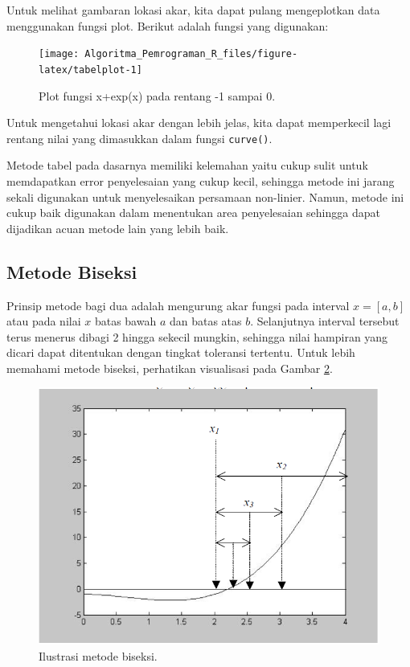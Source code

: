 \documentclass[
]{book}
\theoremstyle{definition}
\theoremstyle{definition}
\theoremstyle{definition}
\theoremstyle{definition}
\theoremstyle{remark}
\begin{document}
Untuk melihat gambaran lokasi akar, kita dapat pulang mengeplotkan data menggunakan fungsi plot. Berikut adalah fungsi yang digunakan:

\begin{figure}

{\centering \texttt{[image: Algoritma\_Pemrograman\_R\_files/figure-latex/tabelplot-1]} 

}

\caption{Plot fungsi x+exp(x) pada rentang -1 sampai 0.}\label{fig:tabelplot}
\end{figure}

Untuk mengetahui lokasi akar dengan lebih jelas, kita dapat memperkecil lagi rentang nilai yang dimasukkan dalam fungsi \texttt{curve()}.

Metode tabel pada dasarnya memiliki kelemahan yaitu cukup sulit untuk memdapatkan error penyelesaian yang cukup kecil, sehingga metode ini jarang sekali digunakan untuk menyelesaikan persamaan non-linier. Namun, metode ini cukup baik digunakan dalam menentukan area penyelesaian sehingga dapat dijadikan acuan metode lain yang lebih baik.

\hypertarget{bisection}{%
\subsection{Metode Biseksi}\label{bisection}}

Prinsip metode bagi dua adalah mengurung akar fungsi pada interval \(x=\left[a,b \right]\) atau pada nilai \(x\) batas bawah \(a\) dan batas atas \(b\). Selanjutnya interval tersebut terus menerus dibagi 2 hingga sekecil mungkin, sehingga nilai hampiran yang dicari dapat ditentukan dengan tingkat toleransi tertentu. Untuk lebih memahami metode biseksi, perhatikan visualisasi pada Gambar \ref{fig:biseksi}.

\begin{figure}

{\centering \includegraphics[width=0.8\linewidth]{./images/biseksi} 

}

\caption{Ilustrasi metode biseksi.}\label{fig:biseksi}
\end{figure}
\end{document}

